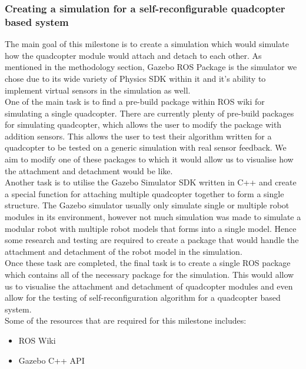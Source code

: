 \documentclass[12pt,A4]{article}
\begin{document}
	\subsubsection{Creating a simulation for a self-reconfigurable quadcopter based system}
	
	The main goal of this milestone is to create a simulation which would simulate how the quadcopter module would attach and detach to each other. As mentioned in the methodology section, Gazebo ROS Package is the simulator we chose due to its wide variety of Physics SDK within it and it's ability to implement virtual sensors in the simulation as well. \\
	
	One of the main task is to find a pre-build package within ROS wiki for simulating a single quadcopter. There are currently plenty of pre-build packages for simulating quadcopter, which allows the user to modify the package with addition sensors. This allows the user to test their algorithm written for a quadcopter to be tested on a generic simulation with real sensor feedback. We aim to modify one of these packages to which it would allow us to visualise how the attachment and detachment would be like. \\
	
	Another task is to utilise the Gazebo Simulator SDK written in C++ and create a special function for attaching multiple quadcopter together to form a single structure. The Gazebo simulator usually only simulate single or multiple robot modules in its environment, however not much simulation was made to simulate a modular robot with multiple robot models that forms into a single model. Hence some research and testing are required to create a package that would handle the attachment and detachment of the robot model in the simulation.\\
	
	Once these task are completed, the final task is to create a single ROS package which contains all of the necessary package for the simulation. This would allow us to visualise the attachment and detachment of quadcopter modules and even allow for the testing of self-reconfiguration algorithm for a quadcopter based system.\\
	
	Some of the resources that are required for this milestone includes:
	\begin{itemize}
		\item ROS Wiki
		\item Gazebo C++ API
	\end{itemize}
	
\end{document}
